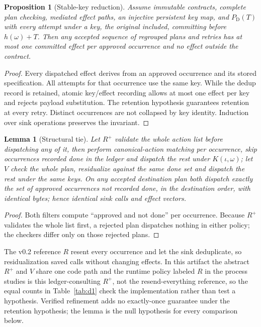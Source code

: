 \documentclass[conference,10pt]{IEEEtran}
\newtheorem{proposition}{Proposition}
\newtheorem{lemma}{Lemma}
\newcommand{\PDT}{P_{\mathrm{D}}(T)}
\begin{document}
\begin{proposition}[Stable-key reduction]\label{prop:reduction}
Assume immutable contracts, complete plan checking, mediated effect paths, an injective persistent key map, and $\PDT$ with every attempt under a key, the original included, committing before $h(\omega)+T$. Then any accepted sequence of regrouped plans and retries has at most one committed effect per approved occurrence and no effect outside the contract.
\end{proposition}
\begin{proof}
Every dispatched effect derives from an approved occurrence and its stored specification. All attempts for that occurrence use the same key. While the dedup record is retained, atomic key/effect recording allows at most one effect per key and rejects payload substitution. The retention hypothesis guarantees retention at every retry. Distinct occurrences are not collapsed by key identity. Induction over sink operations preserves the invariant.
\end{proof}

\begin{lemma}[Structural tie]\label{lem:tie}
Let $R^{+}$ validate the whole action list before dispatching any of it, then perform canonical-action matching per occurrence, skip occurrences recorded \emph{done} in the ledger and dispatch the rest under $K(\iota,\omega)$; let $V$ check the whole plan, residualize against the same \emph{done} set and dispatch the rest under the same keys. On any accepted destination plan both dispatch exactly the set of approved occurrences not recorded done, in the destination order, with identical bytes; hence identical sink calls and effect vectors.
\end{lemma}
\begin{proof}
Both filters compute ``approved and not done'' per occurrence. Because $R^{+}$ validates the whole list first, a rejected plan dispatches nothing in either policy; the checkers differ only on those rejected plans.
\end{proof}
The v0.2 reference $R$ resent every occurrence and let the sink deduplicate, so residualization saved calls without changing effects. In this artifact the abstract $R^{+}$ and $V$ share one code path and the runtime policy labeled $R$ in the process studies is this ledger-consulting $R^{+}$, not the resend-everything reference, so the equal counts in Table~\ref{tab:d1} check the implementation rather than test a hypothesis. Verified refinement adds no exactly-once guarantee under the retention hypothesis; the lemma is the null hypothesis for every comparison below.
\end{document}
